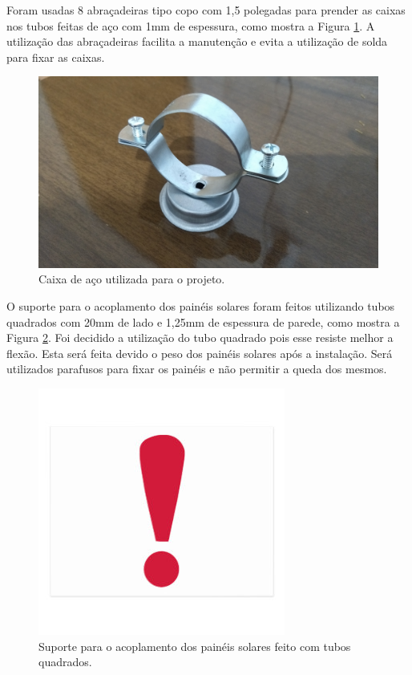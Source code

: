 Foram usadas 8 abraçadeiras tipo copo com 1,5 polegadas para prender as caixas nos tubos feitas de aço com 1mm de espessura, como mostra a Figura \ref{abrac}. A utilização das abraçadeiras facilita a manutenção e evita a utilização de solda para fixar as caixas.

\begin{figure}[H]
	\centering
    \includegraphics[keepaspectratio=true,scale=0.1]{figuras/abrac.jpg}
    \caption{Caixa de aço utilizada para o projeto.}
    \label{abrac}
\end{figure}

O suporte para o acoplamento dos painéis solares foram feitos utilizando tubos quadrados com 20mm de lado e 1,25mm de espessura de parede, como mostra a Figura \ref{tuboquad}. Foi decidido a utilização do tubo quadrado pois esse resiste melhor a flexão. Esta será feita devido o peso dos painéis solares após a instalação. Será utilizados parafusos para fixar os painéis e não permitir a queda dos mesmos. 

\begin{figure}[H]
	\centering
    \includegraphics[keepaspectratio=true,scale=1]{figuras/nophoto.jpg}
    \caption{Suporte para o acoplamento dos painéis solares feito com tubos quadrados.}
    \label{tuboquad}
\end{figure}

